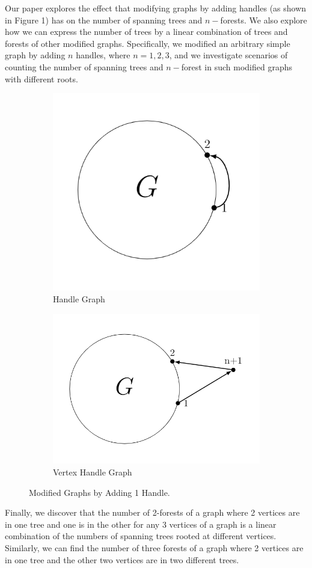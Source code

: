 \documentclass[twoside,11pt]{article}
\numberwithin{equation}{section} \DeclareMathOperator{\Var}{Var}
\begin{document}
   Our paper explores the effect that modifying graphs by adding handles (as shown in Figure 1) has on the number of spanning trees and $n-$forests. We also explore how we can express the number of trees by a linear combination of trees and forests of other modified graphs. Specifically, we modified an arbitrary simple graph by adding $n$ handles, where $n=1,2,3$, and we investigate scenarios of counting the number of spanning trees and $n-$forest in such modified graphs with different roots. 
   
   \begin{figure}[H]
\begin{subfigure}{.5\textwidth}
  \centering
  \includegraphics[width=.4\linewidth]{tik_handle_graph.PNG}  \caption{Handle Graph}
\end{subfigure}
\begin{subfigure}{.5\textwidth}
  \centering
  \includegraphics[width=.5\linewidth]{tik_vertex_handle_graph.PNG}  \caption{Vertex Handle Graph}
\end{subfigure}
\caption{Modified Graphs by Adding 1 Handle.}
\label{fig:H_VH}
\end{figure}
   
   Finally, we discover that the number of 2-forests of a graph where 2 vertices are in one tree and one is in the other for any 3 vertices of a graph is a linear combination of the numbers of spanning trees rooted at different vertices. Similarly, we can find the number of three forests of a graph where 2 vertices are in one tree and the other two vertices are in two different trees.
\end{document}
